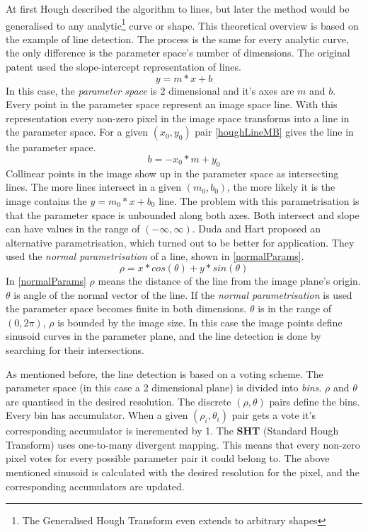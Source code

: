 At first Hough described the algorithm to lines, but later the method would be generalised to any analytic\footnote{The Generalised Hough Transform even extends to arbitrary shapes} curve or shape.
This theoretical overview is based on the example of line detection.
The process is the same for every analytic curve, the only difference is the parameter space's number of dimensions.
The original patent\cite{houghPatent} used the slope-intercept representation of lines.
\begin{equation}
y = m*x + b
\end{equation}
In this case, the \emph{parameter space} is 2 dimensional and it's axes are $m$ and $b$.
Every point in the parameter space represent an image space line.
With this representation every non-zero pixel in the image space transforms into a line in the parameter space.
For a given $(x_0,y_0)$ pair \eqref{houghLineMB} gives the line in the parameter space. 
\begin{equation}
\label{eq:houghLineMB}
b = -x_0*m + y_0
\end{equation}
Collinear points in the image show up in the parameter space as intersecting lines.
The more lines intersect in a given $(m_0,b_0)$, the more likely it is the image contains the $y = m_0*x + b_0$ line.
The problem with this parametrisation is that the parameter space is unbounded along both axes.
Both intersect and slope can have values in the range of $(-\infty, \infty)$.
Duda and Hart\cite{houghThetaRho} proposed an alternative parametrisation, which turned out to be better for application.
They used the \emph{normal parametrisation} of a line, shown in \eqref{normalParams}.
\begin{equation}
	\label{eq:normalParams}
	\rho = x*cos(\theta) + y*sin(\theta)
\end{equation}
In \eqref{normalParams} $\rho$ means the distance of the line from the image plane's origin.
$\theta$ is angle of the normal vector of the line.
If the \emph{normal parametrisation} is used the parameter space becomes finite in both dimensions.
$\theta$ is in the range of $(0,2\pi)$, $\rho$ is bounded by the image size.
In this case the image points define sinusoid curves in the parameter plane, and the line detection is done by searching for their intersections.

As mentioned before, the line detection is based on a voting scheme.
The parameter space (in this case a 2 dimensional plane) is divided into \emph{bins}.
$\rho$ and $\theta$ are quantised in the desired resolution.
The discrete $(\rho,\theta)$ pairs define the bins.
Every bin has accumulator.
When a given $(\rho_i,\theta_i)$ pair gets a vote it's corresponding accumulator is incremented by 1.
The \textbf{SHT} (Standard Hough Transform) uses one-to-many divergent mapping.
This means that every non-zero pixel votes for every possible parameter pair it could belong to.
The above mentioned sinusoid is calculated with the desired resolution for the pixel, and the corresponding accumulators are updated.

